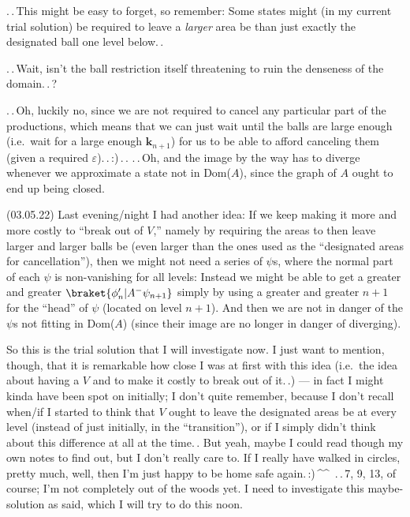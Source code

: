 \documentclass{report}
\begin{document}
.\,.\,This might be easy to forget, so remember: Some states might (in my current trial solution) be required to leave a \emph{larger} area be than just exactly the designated ball one level below.\,. 

.\,.\,Wait, isn't the ball restriction itself threatening to ruin the denseness of the domain.\,.\,? %

.\,.\,Oh, luckily no, since we are not required to cancel any particular part of the productions, which means that we can just wait until the balls are large enough (i.e.\ wait for a large enough $\mathbf{k}_{n+1}$) for us to be able to afford canceling them (given a required $\varepsilon$).\,.\,:)\,.\,. .\,.\,Oh, and the image by the way has to diverge whenever we approximate a state not in Dom($A$), since the graph of $A$ ought to end up being closed. %

(03.05.22) Last evening/night I had another idea: If we keep making it more and more costly to ``break out of $V$,'' namely by requiring the areas to then leave larger and larger balls be (even larger than the ones used as the ``designated areas for cancellation''), then we might not need a series of $\psi$s, where the normal part of each $\psi$ is non-vanishing for all levels: Instead we might be able to get a greater and greater $\braket{\phi'_{n}   | A^- \psi_{n+1}}$ simply by using a greater and greater $n+1$ for the ``head'' of $\psi$ (located on level $n+1$). %
And then we are not in danger of the $\psi$s not fitting in Dom($A$) (since their image are no longer in danger of diverging). 

So this is the trial solution that I will investigate now. I just want to mention, though, that it is remarkable how close I was at first with this idea (i.e.\ the idea about having a $V$ and to make it costly to break out of it.\,.) --- in fact I might kinda have been spot on initially; I don't quite remember, because I don't recall when/if I started to think that $V$ ought to leave the designated areas be at every level (instead of just initially, in the ``transition''), or if I simply didn't think about this difference at all at the time.\,. But yeah, maybe I could read though my own notes to find out, but I don't really care to. If I really have walked in circles, pretty much, well, then I'm just happy to be home safe again.\,:)\,\textasciicircum\textasciicircum\ .\,.\,7, 9, 13, of course; I'm not completely out of the woods yet. I need to investigate this maybe-solution as said, which I will try to do this noon. %
\end{document}
